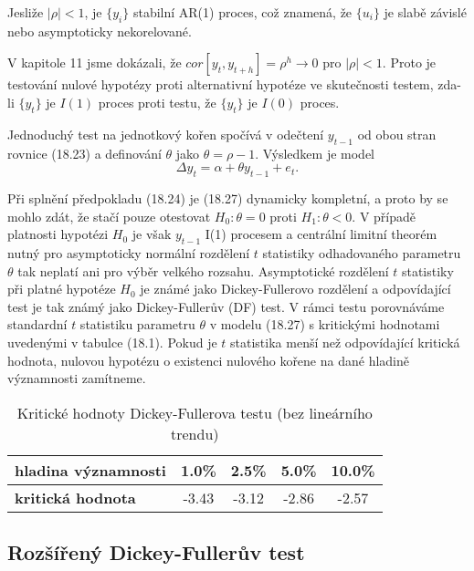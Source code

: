 Jesliže $|\rho| <1$, je $\{y_i\}$ stabilní AR(1) proces, což znamená, že $\{u_i\}$ je slabě závislé nebo 
asymptoticky nekorelované.

V kapitole 11 jsme dokázali, že $cor[y_t, y_{t+h}] = \rho^h \rightarrow 0$ pro 
$|\rho| < 1$. Proto je testování nulové hypotézy proti 
alternativní hypotéze ve skutečnosti testem, zda-li $\{y_t\}$ 
je $I(1)$ proces proti testu, že $\{y_t\}$ je $I(0)$ proces.

Jednoduchý test na jednotkový kořen spočívá v odečtení $y_{t-1}$ od obou stran rovnice (18.23) a definování 
$\theta$ jako $\theta = \rho - 1$. Výsledkem je model
\begin{equation}
\Delta y_t = \alpha + \theta y_{t-1} + e_t.
\end{equation}

Při splnění předpokladu (18.24) je (18.27) dynamicky kompletní, a proto by se mohlo zdát, že stačí pouze otestovat $H_0: 
\theta = 0$ proti $H_1: \theta < 0$. V případě platnosti hypotézi $H_0$ je 
však $y_{t-1}$ I(1) procesem a centrální limitní theorém nutný pro asymptoticky normální 
rozdělení $t$ statistiky odhadovaného parametru $\theta$ tak neplatí ani pro výběr velkého rozsahu. Asymptotické 
rozdělení $t$ statistiky při platné hypotéze $H_0$ je známé jako Dickey-Fullerovo rozdělení a 
odpovídající test je tak známý jako Dickey-Fullerův (DF) test. V 
rámci testu porovnáváme standardní $t$ statistiku parametru $\theta$ 
v modelu (18.27) s kritickými hodnotami uvedenými v tabulce (18.1). 
Pokud je $t$ statistika menší než odpovídající kritická hodnota, 
nulovou hypotézu o existenci nulového kořene na dané hladině významnosti zamítneme.

\begin{table}
\begin{center}
\begin{tabular}{| l | c | c | c | c |}
\hline
\bf{hladina významnosti} & 1.0\% & 2.5\% & 5.0\% & 10.0\%\\
\hline
\bf{kritická hodnota} & -3.43 & -3.12 & -2.86 & -2.57\\
\hline
\end{tabular}
\caption{Kritické hodnoty Dickey-Fullerova testu (bez lineárního trendu)}
\end{center}
\end{table}

\subsection{Rozšířený Dickey-Fullerův test}

